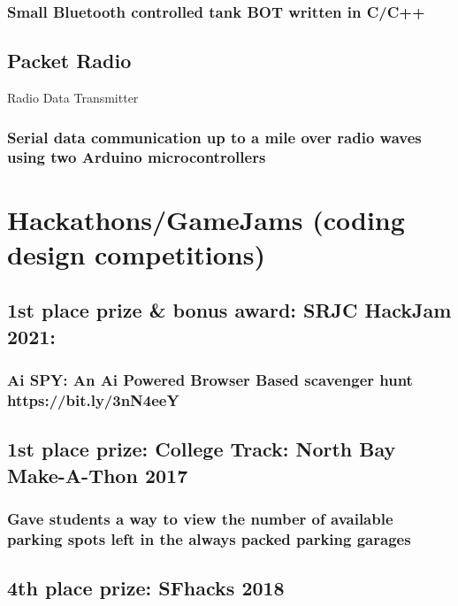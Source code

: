 \documentclass{article}
\begin{document}
		\subsubsection{Small Bluetooth controlled tank BOT written in C/C++}
	\subsection{Packet Radio} Radio Data Transmitter
    	\vspace{-3mm}
		\subsubsection{ Serial data communication up to a mile over radio waves using two Arduino microcontrollers}
\section{Hackathons/GameJams (coding design competitions)}
    \subsection{ 1st place prize \& bonus award: SRJC HackJam 2021:}
        \subsubsection{Ai SPY: An Ai Powered Browser Based scavenger hunt https://bit.ly/3nN4eeY }   

    \subsection{ 1st place prize: College Track: North Bay Make-A-Thon 2017}
        \subsubsection{Gave students a way to view the number of available parking spots left in the always packed parking garages}

	\subsection{ 4th place prize: SFhacks 2018}
\end{document}
